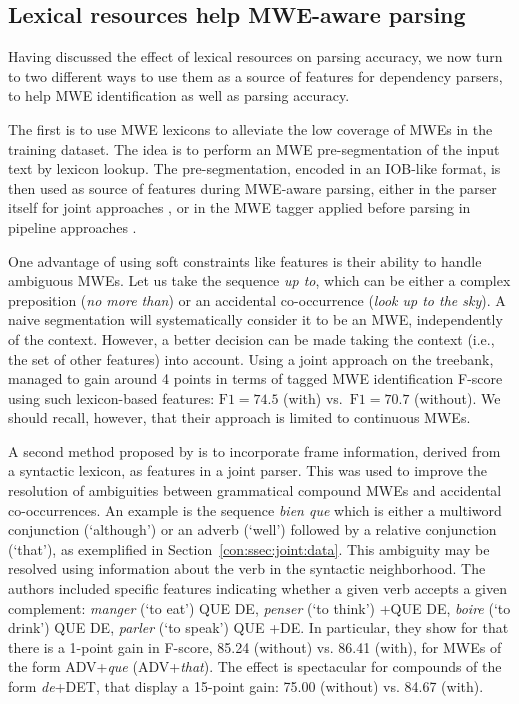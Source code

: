 \documentclass[output=paper]{langsci/langscibook}
\begin{document}
\subsection{Lexical resources help MWE-aware parsing}\largerpage
\label{con:ssec:lex-help-mwe}

Having discussed the effect of lexical resources on parsing accuracy, we now turn to two different ways to use them as a source of features for dependency parsers, to help MWE identification as well as parsing accuracy. 

The first is to use MWE lexicons to alleviate the low coverage of MWEs in the training dataset. The idea is to perform an MWE pre-segmentation of the input text by lexicon lookup. The pre-segmentation, encoded in an IOB-like format, is then used as source of features during MWE-aware parsing, either in the parser itself for joint approaches \citep{candito2014strategies}, or in the MWE tagger applied before parsing in pipeline approaches \citep{constant12acl,constant13mwe}.  

One advantage of using soft constraints like features is their ability to handle ambiguous MWEs.
Let us take the sequence \textit{up to}, which can be either a complex preposition (\textit{no more than}) or an accidental co-occurrence (\textit{look up to the sky}). A naive segmentation will systematically consider it to be an MWE, independently of the context. However, a better decision can be made taking the context (i.e., the set of other features) into account. Using a joint approach on the  treebank, \citet{candito2014strategies} managed to gain around 4 points in terms of tagged MWE identification F-score using such lexicon-based features: $\text{F}1=74.5$ (with) vs.\ $\text{F}1=70.7$ (without). We should recall, however, that their approach is limited to continuous MWEs.


A second method proposed by \citet{nasretal15} is to incorporate  frame information, derived from a syntactic lexicon, as features in a joint parser. This was used to improve the resolution of ambiguities between grammatical compound MWEs and accidental co-occurrences.
An example is the  sequence \textit{bien que} which is either a multiword conjunction (`although') or  an adverb (`well') followed by a relative conjunction (`that'), as exemplified in Section~\ref{con:ssec:joint:data}. This ambiguity may be resolved using information about the verb in the syntactic neighborhood. The authors included specific features indicating whether a given verb accepts a given complement: \textit{manger} (`to eat') \textminus QUE \textminus DE, \textit{penser} (`to think') +QUE \textminus DE, \textit{boire} (`to drink') \textminus QUE \textminus DE, \textit{parler} (`to speak') \textminus QUE +DE. 
In particular, they show for  that there is a 1-point gain in F-score, 85.24 (without) vs. 86.41 (with), for MWEs of the form ADV+\textit{que} (ADV+\textit{that}). The effect is spectacular for compounds of the form \textit{de}+DET, that display a 15-point gain: 75.00 (without) vs. 84.67 (with).
\end{document}
